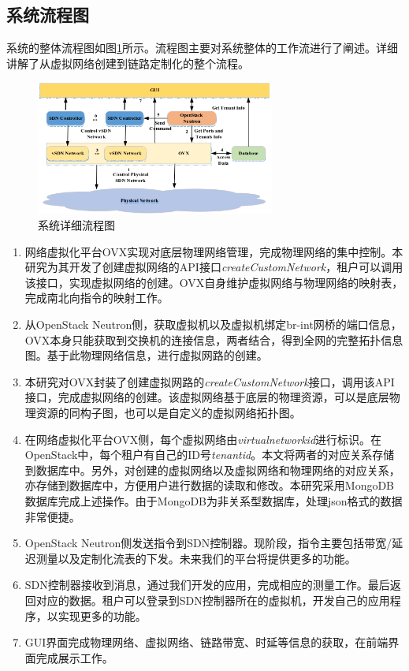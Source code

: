 \subsection{系统流程图}
系统的整体流程图如图\ref{fig:workflow}所示。流程图主要对系统整体的工作流进行了阐述。详细讲解了从虚拟网络创建到链路定制化的整个流程。

\begin{figure}[!htb]
  \centering
  \includegraphics[width=0.7\textwidth]{logo/workflow.png}
  \caption{系统详细流程图}
  \label{fig:workflow}
\end{figure}

\begin{enumerate}
\item 网络虚拟化平台OVX实现对底层物理网络管理，完成物理网络的集中控制。本研究为其开发了创建虚拟网络的API接口\emph{createCustomNetwork}，租户可以调用该接口，实现虚拟网络的创建。OVX自身维护虚拟网络与物理网络的映射表，完成南北向指令的映射工作。
\item 从OpenStack Neutron侧，获取虚拟机以及虚拟机绑定br-int网桥的端口信息，OVX本身只能获取到交换机的连接信息，两者结合，得到全网的完整拓扑信息图。基于此物理网络信息，进行虚拟网路的创建。
\item 本研究对OVX封装了创建虚拟网路的\emph{createCustomNetwork}接口，调用该API接口，完成虚拟网络的创建。该虚拟网络基于底层的物理资源，可以是底层物理资源的同构子图，也可以是自定义的虚拟网络拓扑图。
\item 在网络虚拟化平台OVX侧，每个虚拟网络由\emph{virtualnetworkid}进行标识。在OpenStack中，每个租户有自己的ID号\emph{tenantid}。本文将两者的对应关系存储到数据库中。另外，对创建的虚拟网络以及虚拟网络和物理网络的对应关系，亦存储到数据库中，方便用户进行数据的读取和修改。本研究采用MongoDB数据库完成上述操作。由于MongoDB为非关系型数据库，处理json格式的数据非常便捷。
\item OpenStack Neutron侧发送指令到SDN控制器。现阶段，指令主要包括带宽/延迟测量以及定制化流表的下发。未来我们的平台将提供更多的功能。
\item SDN控制器接收到消息，通过我们开发的应用，完成相应的测量工作。最后返回对应的数据。租户可以登录到SDN控制器所在的虚拟机，开发自己的应用程序，以实现更多的功能。
\item GUI界面完成物理网络、虚拟网络、链路带宽、时延等信息的获取，在前端界面完成展示工作。
\end{enumerate}

